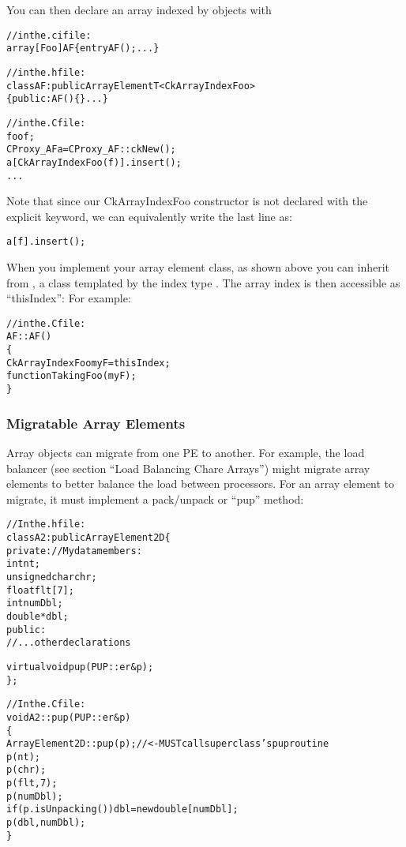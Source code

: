 You can then declare an array indexed by  objects with

\begin{alltt}
//in the .ci file:
array [Foo] AF \{ entry AF(); ... \}

//in the .h file:
class AF:public ArrayElementT<CkArrayIndexFoo>
\{ public: AF() \{\} ... \}

//in the .C file:
    foo f;
    CProxy_AF a=CProxy_AF::ckNew();
    a[CkArrayIndexFoo(f)].insert();
    ...
\end{alltt}

Note that since our CkArrayIndexFoo constructor is not declared
with the explicit keyword, we can equivalently write the last line as:

\begin{alltt}
    a[f].insert();
\end{alltt}

When you implement your array element class, as shown above you 
can inherit from
, a class templated by the index type .
The array index is then accessible as ``thisIndex'':
For example:

\begin{alltt}

//in the .C file:
AF::AF()
\{
    CkArrayIndexFoo myF=thisIndex;
    functionTakingFoo(myF);
\}
\end{alltt}


\subsubsection{Migratable Array Elements}
Array objects can migrate from one PE to another.
For example, the load balancer (see section ``Load Balancing Chare Arrays'')
might migrate array elements to better balance the load between
processors.  For an array element to migrate, it must implement
a pack/unpack or ``pup'' method:

\begin{alltt}
//In the .h file:
class A2:public ArrayElement2D \{
private: //My data members:
    int nt;
    unsigned char chr;
    float flt[7];
    int numDbl;
    double *dbl;
public:	
    //...other declarations

    virtual void pup(PUP::er \&p);
\};

//In the .C file:
void A2::pup(PUP::er \&p)
\{
    ArrayElement2D::pup(p); //<- MUST call superclass's pup routine
    p(nt);
    p(chr);
    p(flt,7);
    p(numDbl);
    if (p.isUnpacking()) dbl=new double[numDbl];
    p(dbl,numDbl);
\}
\end{alltt}

